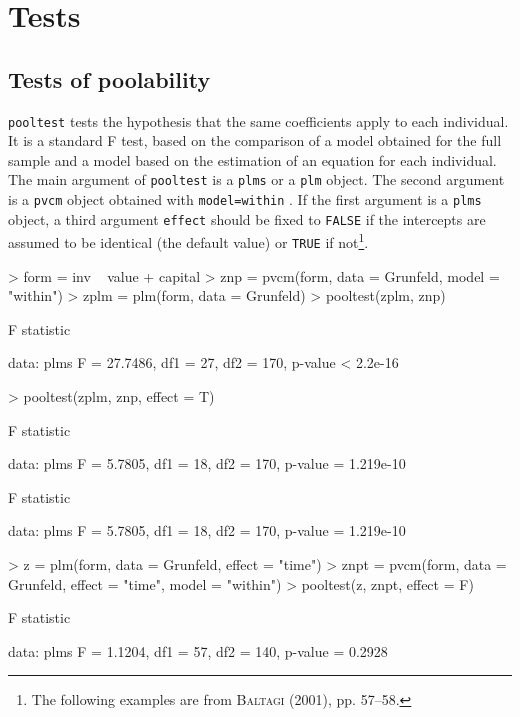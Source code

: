 \documentclass{article}
\begin{document}
\section{Tests}


\subsection{Tests of poolability}

\texttt{pooltest} tests the hypothesis that the same coefficients
apply to each individual. It is a standard F test, based on the
comparison of a model obtained for the full sample and a model based
on the estimation of an equation for each individual. The main
argument of \texttt{pooltest} is a \texttt{plms} or a \texttt{plm} object. 
The second argument is a \texttt{pvcm} object obtained with \texttt{model=within} .
If the first argument is a \texttt{plms} object, 
a third argument  \texttt{effect} should be fixed to \texttt{FALSE} if
the intercepts are assumed to be identical (the default value) or \texttt{TRUE} if
not\footnote{The following examples are from 
  \textsc{Baltagi} (2001), pp. 57--58.}.

\begin{Schunk}
\begin{Sinput}
> form = inv ~ value + capital
> znp = pvcm(form, data = Grunfeld, model = "within")
> zplm = plm(form, data = Grunfeld)
> pooltest(zplm, znp)
\end{Sinput}
\begin{Soutput}
	F statistic

data:  plms 
F = 27.7486, df1 = 27, df2 = 170, p-value < 2.2e-16
\end{Soutput}
\begin{Sinput}
> pooltest(zplm, znp, effect = T)
\end{Sinput}
\begin{Soutput}
	F statistic

data:  plms 
F = 5.7805, df1 = 18, df2 = 170, p-value = 1.219e-10
\end{Soutput}
\begin{Soutput}
	F statistic

data:  plms 
F = 5.7805, df1 = 18, df2 = 170, p-value = 1.219e-10
\end{Soutput}
\begin{Sinput}
> z = plm(form, data = Grunfeld, effect = "time")
> znpt = pvcm(form, data = Grunfeld, effect = "time", model = "within")
> pooltest(z, znpt, effect = F)
\end{Sinput}
\begin{Soutput}
	F statistic

data:  plms 
F = 1.1204, df1 = 57, df2 = 140, p-value = 0.2928
\end{Soutput}
\end{Schunk}
\end{document}
